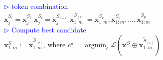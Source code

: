 \begin{algorithm}[H]
{{{            
                {
                \textcolor{blue}{$\rhd$ token combination}\\
                {
            $\boldsymbol{x}_{j}^{\tilde{S}_{i}}= \boldsymbol{x}_{j}^{\tilde{S}_{i}}$ 
                }
            \Else 
                {
            $\boldsymbol{x}_{j}^{\tilde{S}_{i}}= \boldsymbol{x}_{j}^{\tilde{S}_{i-1}}$ 
                }
                }
            }
        $\boldsymbol{x}_{1:m}^{\tilde{S}_{(c)}}=\boldsymbol{x}_{1:m}^{\tilde{S_1}}, \boldsymbol{x}_{1:m}^{\tilde{S_2}}, \ldots, \boldsymbol{x}_{1:m}^{\tilde{S_p}}$ \\
    \textcolor{blue}{$\rhd$ Compute best candidate}\\
        $\boldsymbol{x}_{1:m}^{S}:=\boldsymbol{x}_{1:m}^{\tilde{S}_{_{(c^{\star})}}}$, where $c^{\star}=\operatorname{argmin}_c \mathcal{L}\left(\boldsymbol{x}^{O} \oplus \boldsymbol{x}_{1:m}^{\tilde{S}_{(c)}}\right)$
	}
 }
\end{algorithm}